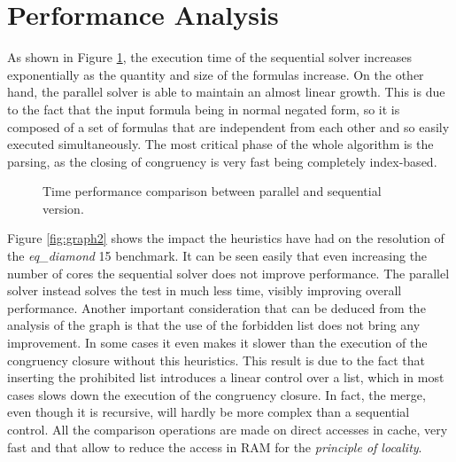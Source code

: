 \documentclass{IEEEtran}
\begin{document}
\section{Performance Analysis}
As shown in Figure \ref{fig:graph1}, the execution time of the sequential solver increases exponentially as the quantity and size of the formulas increase. On the other hand, the parallel solver is able to maintain an almost linear growth. This is due to the fact that the input formula being in normal negated form, so it is composed of a set of formulas that are independent from each other and so easily executed simultaneously. The most critical phase of the whole algorithm is the parsing, as the closing of congruency is very fast being completely index-based. 
\begin{figure}[htpb]
\centering
{}
\caption{Time performance comparison between parallel and sequential version.}
\label{fig:graph1}
\end{figure}


Figure \ref{fig:graph2} shows the impact the heuristics have had on the resolution of the \textit{eq\_diamond} 15 benchmark. It can be seen easily that even increasing the number of cores the sequential solver does not improve performance. The parallel solver instead solves the test in much less time, visibly improving overall performance. Another important consideration that can be deduced from the analysis of the graph is that the use of the forbidden list does not bring any improvement. In some cases it even makes it slower than the execution of the congruency closure without this heuristics.
This result is due to the fact that inserting the prohibited list introduces a linear control over a list, which in most cases slows down the execution of the congruency closure. In fact, the merge, even though it is recursive, will hardly be more complex than a sequential control.  All the comparison operations are made on direct accesses in cache, very fast and that allow to reduce the access in RAM for the \textit{principle of locality}.
\end{document}
